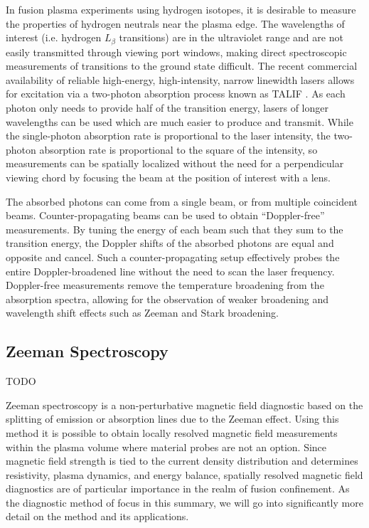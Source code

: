 \documentclass{jpp}
\begin{document}
In fusion plasma experiments using hydrogen isotopes, it is desirable to measure the properties of hydrogen neutrals near the plasma edge. The wavelengths of interest (i.e. hydrogen $L_\beta$ transitions) are in the ultraviolet range and are not easily transmitted through viewing port windows, making direct spectroscopic measurements of transitions to the ground state difficult. The recent commercial availability of reliable high-energy, high-intensity, narrow linewidth lasers allows for excitation via a two-photon absorption process known as TALIF \citep{MageeRM2012Atpa}. As each photon only needs to provide half of the transition energy, lasers of longer wavelengths can be used which are much easier to produce and transmit. While the single-photon absorption rate is proportional to the laser intensity, the two-photon absorption rate is proportional to the square of the intensity, so measurements can be spatially localized without the need for a perpendicular viewing chord by focusing the beam at the position of interest with a lens.

The absorbed photons can come from a single beam, or from multiple coincident beams. Counter-propagating beams can be used to obtain ``Doppler-free'' measurements. By tuning the energy of each beam such that they sum to the transition energy, the Doppler shifts of the absorbed photons are equal and opposite and cancel. Such a counter-propagating setup effectively probes the entire Doppler-broadened line without the need to scan the laser frequency. Doppler-free measurements remove the temperature broadening from the absorption spectra, allowing for the observation of weaker broadening and wavelength shift effects such as Zeeman and Stark broadening.

\subsection{Zeeman Spectroscopy}

{\Large TODO \par}

Zeeman spectroscopy is a non-perturbative magnetic field diagnostic based on the splitting of emission or absorption lines due to the Zeeman effect. Using this method it is possible to obtain locally resolved magnetic field measurements within the plasma volume where material probes are not an option. Since magnetic field strength is tied to the current density distribution and determines resistivity, plasma dynamics, and energy balance, spatially resolved magnetic field diagnostics are of particular importance in the realm of fusion confinement. As the diagnostic method of focus in this summary, we will go into significantly more detail on the method and its applications.
\end{document}
